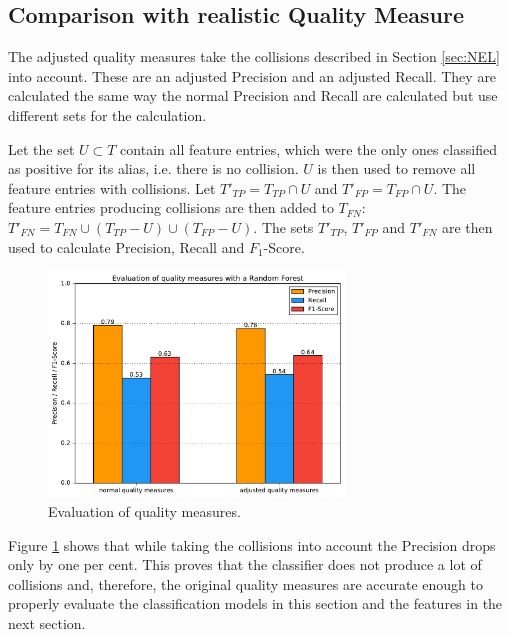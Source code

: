 \subsection{Comparison with realistic Quality Measure}
The adjusted quality measures take the collisions described in Section \ref{sec:NEL} into account. These are an adjusted Precision and an adjusted Recall. They are calculated the same way the normal Precision and Recall are calculated but use different sets for the calculation.\par
Let the set $U \subset T$ contain all feature entries, which were the only ones classified as positive for its alias, i.e. there is no collision. $U$ is then used to remove all feature entries with collisions. Let $T'_{TP} = T_{TP} \cap U$ and $T'_{FP} = T_{FP} \cap U$. The feature entries producing collisions are then added to $T_{FN}$: $T'_{FN} = T_{FN} \cup (T_{TP} - U) \cup (T_{FP} - U)$. The sets $T'_{TP}$, $T'_{FP}$ and $T'_{FN}$ are then used to calculate Precision, Recall and $F_1$-Score.\par
\begin{figure}[H]
	\centering
	\includegraphics[width=0.7\textwidth]{img/qualitymeasure_eval}
	\caption{Evaluation of quality measures.}
	\label{qualitymeasure_eval}
\end{figure}
Figure \ref{qualitymeasure_eval} shows that while taking the collisions into account the Precision drops only by one per cent. This proves that the classifier does not produce a lot of collisions and, therefore, the original quality measures are accurate enough to properly evaluate the classification models in this section and the features in the next section.

